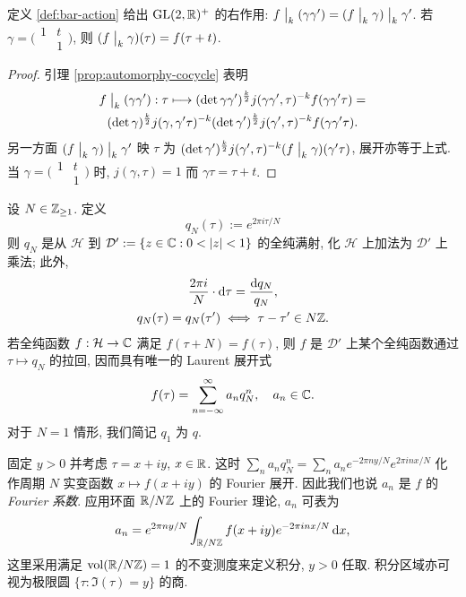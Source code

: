 \begin{lemma}
	定义 \ref{def:bar-action} 给出 $\operatorname{GL}(2,\mathbb{R})^+$ 的右作用: $f\;\big|_{k} \;(\gamma\gamma') = (f\;\big|_{k} \; \gamma)\;\big|_{k} \; \gamma'$. 若 $\gamma = \bigl(\begin{smallmatrix} 1 & t \\ & 1 \end{smallmatrix}\bigr)$, 则 $(f\;\big|_{k} \; \gamma)(\tau) = f(\tau + t)$.
\end{lemma}
\begin{proof}
	引理 \ref{prop:automorphy-cocycle} 表明
	\begin{multline*}
		f\;\big|_{k} \; (\gamma\gamma'): \tau \longmapsto (\det\gamma\gamma')^{\frac{k}{2}} j(\gamma\gamma', \tau)^{-k} f(\gamma\gamma'\tau) = \\
		(\det\gamma)^{\frac{k}{2}} j(\gamma, \gamma'\tau)^{-k} (\det\gamma')^{\frac{k}{2}} j(\gamma', \tau)^{-k} f(\gamma\gamma'\tau).
	\end{multline*}
	另一方面 $(f\;\big|_{k} \;\gamma) \;\big|_{k} \; \gamma'$ 映 $\tau$ 为 $(\det\gamma')^{\frac{k}{2}} j(\gamma', \tau)^{-k} (f\;\big|_{k} \;\gamma)(\gamma' \tau)$, 展开亦等于上式. 当 $\gamma = \bigl(\begin{smallmatrix} 1 & t \\ & 1 \end{smallmatrix}\bigr)$ 时, $j(\gamma,\tau)=1$ 而 $\gamma\tau = \tau + t$.
\end{proof}

设 $N \in \mathbb{Z}_{\geq 1}$. 定义 
\[ q_N(\tau) := e^{2\pi i\tau/N} \]
则 $q_N$ 是从 $\mathcal{H}$ 到 $\mathcal{D}' := \{ z \in \CC: 0<|z|<1 \}$ 的全纯满射, 化 $\mathcal{H}$ 上加法为 $\mathcal{D}'$ 上乘法; 此外,
\begin{equation*}\begin{gathered}
	\frac{2\pi i}{N} \cdot \mathop{}\!\mathrm{d}\tau = \frac{\mathop{}\!\mathrm{d} q_N}{q_N}, \\
	q_N(\tau) = q_N(\tau') \iff \tau - \tau' \in N\mathbb{Z}.
\end{gathered}\end{equation*}
若全纯函数 $f: \mathcal{H} \to \mathbb{C}$ 满足 $f(\tau + N) = f(\tau)$, 则 $f$ 是 $\mathcal{D}'$ 上某个全纯函数通过 $\tau \mapsto q_N$ 的拉回, 因而具有唯一的 Laurent 展开式
\begin{equation}\label{eqn:Laurent-expansion}
	f(\tau) = \sum_{n=-\infty}^\infty a_n q_N^n, \quad a_n \in \mathbb{C}.
\end{equation}
对于 $N=1$ 情形, 我们简记 $q_1$ 为 $q$.

\begin{remark}\label{rem:Fourier-coeff} 
	固定 $y > 0$ 并考虑 $\tau = x + iy$, $x \in \mathbb{R}$. 这时 $\sum_n a_n q_N^n = \sum_n a_n e^{-2\pi ny/N} e^{2\pi inx/N}$ 化作周期 $N$ 实变函数 $x \mapsto f(x+iy)$ 的 Fourier 展开. 因此我们也说 $a_n$ 是 $f$ 的 \emph{Fourier 系数}. 应用环面 $\mathbb{R}/N\mathbb{Z}$ 上的 Fourier 理论,  $a_n$ 可表为
	\[ a_n = e^{2\pi ny /N} \int_{\mathbb{R}/N\mathbb{Z}} f(x+iy) e^{-2\pi inx/N} \mathop{}\!\mathrm{d} x, \]
	这里采用满足 $\operatorname{vol}(\mathbb{R}/N\mathbb{Z}) = 1$ 的不变测度来定义积分, $y > 0$ 任取. 积分区域亦可视为极限圆 $\{\tau: \Im(\tau)=y\}$ 的商.
\end{remark}

